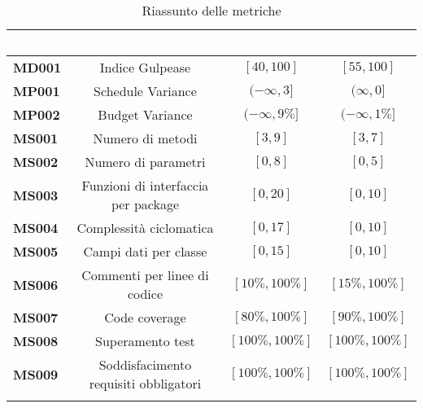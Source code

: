 	\renewcommand{\arraystretch}{1.5}
	\begin{longtable}{C{4cm} c c c}
	
	\textcolor{white}{\textbf{Codice}} &
	\textcolor{white}{\textbf{Nome}} &
	\textcolor{white}{\textbf{Accettabile}} &
	\textcolor{white}{\textbf{Ottimale}}\\
	\endhead

	\textbf{MD001} &
	Indice Gulpease &
	$[40 , 100] $&
	$[55 , 100]$\\

	\textbf{MP001} &
	Schedule Variance &
	$(-\infty , 3] $&
	$(\infty , 0]$\\
	
	\textbf{MP002} &
	Budget Variance &
	$(-\infty , 9\%] $&
	$(-\infty , 1\%]$\\


	\textbf{MS001} &
	Numero di metodi &
	$[3 , 9] $&
	$[3 , 7]$\\
	
	\textbf{MS002} &
	Numero di parametri &
	$[0 , 8] $&
	$[0 , 5]$\\
	
	\textbf{MS003} &
	Funzioni di interfaccia per package &
	$[0 , 20] $&
	$[0 , 10]$\\
	
	\textbf{MS004} &
	Complessità ciclomatica &
	$[0 , 17] $&
	$[0 , 10]$\\
	
	\textbf{MS005} &
	Campi dati per classe &
	$[0 , 15] $&
	$[0 , 10]$\\
	
	\textbf{MS006} &
	Commenti per linee di codice &
	$[10\%, 100\%] $&
	$[15\% , 100\%]$\\
	
	\textbf{MS007} &
	Code coverage &
	$[80\%, 100\%]$&
	$[90\%, 100\%]$\\

	
	\textbf{MS008} &
	Superamento test &
	$[100\%, 100\%]$&
	$[100\%, 100\%]$\\
	
	\textbf{MS009} &
	Soddisfacimento requisiti obbligatori &
	$[100\%, 100\%]$&
	$[100\%, 100\%]$\\
	
	\caption{Riassunto delle metriche}\\	
	\end{longtable}